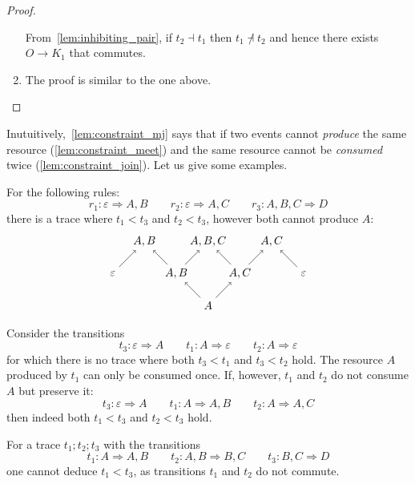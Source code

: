 \begin{proof}
\begin{enumerate}
    From~\autoref{lem:inhibiting_pair}, if $t_2\dashv t_1$ then $t_1\not\dashv t_2$ and hence there exists $O\to K_1$ that commutes.
    \item The proof is similar to the one above.
  \end{enumerate}
\end{proof}

Inutuitively,~\autoref{lem:constraint_mj} says that if two events cannot \emph{produce} the same resource (\autoref{lem:constraint_meet}) and the same resource cannot be \emph{consumed} twice (\autoref{lem:constraint_join}). Let us give some examples.
\begin{example}
  For the following rules:
  \[
  r_1:\varepsilon \Rightarrow A,B \qquad r_2: \varepsilon \Rightarrow A,C \qquad r_3: A,B,C \Rightarrow D
  \]
  there is a trace where $t_1<t_3$ and $t_2<t_3$, however both cannot produce $A$:
    \[
    \begin{tikzpicture} %
      \node (o) at (0,-1) {\(A\)};
      \node (r3) at (0,1) {\(A,B,C\)};
      \node (o1) at (-1,0) {\(A,B\)};
      \node (o2) at (1,0) {\(A,C\)};
      \node (r1) at (-2,1) {\(A,B\)};
      \node (r2) at (2,1) {\(A,C\)};
      \node (k1) at (-3,0) {\(\varepsilon\)};
      \node (k2) at (3,0) {\(\varepsilon\)};
      \draw [->] (o) -- (o1);
      \draw [->] (o) -- (o2);
      \draw [->] (o1) -- (r3);
      \draw [->] (o2) -- (r3);
      \draw [->] (o1) -- (r1);
      \draw [->] (o2) -- (r2);
      \draw [->] (k1) -- (r1);
      \draw [->] (k2) -- (r2);
    \end{tikzpicture}
    \]
\end{example}
\begin{example}
  Consider the transitions
  \[
  t_3: \varepsilon \Rightarrow A\qquad t_1: A\Rightarrow \varepsilon \qquad t_2: A\Rightarrow \varepsilon
  \]
  for which there is no trace where both $t_3<t_1$ and $t_3<t_2$ hold. The resource $A$ produced by $t_1$ can only be consumed once.
  If, however, $t_1$ and $t_2$ do not consume $A$ but preserve it:
  \[
  t_3: \varepsilon \Rightarrow A\qquad t_1: A\Rightarrow A,B \qquad t_2: A\Rightarrow A,C
  \]
  then indeed both $t_1<t_3$ and $t_2<t_3$ hold.
\end{example}
\begin{example}
  For a trace $t_1;t_2;t_3$ with the transitions
  \[
  t_1: A \Rightarrow A,B\qquad t_2: A,B\Rightarrow B,C \qquad t_3: B,C\Rightarrow D
  \]
  one cannot deduce $t_1<t_3$, as transitions $t_1$ and $t_2$ do not commute.
\end{example}



